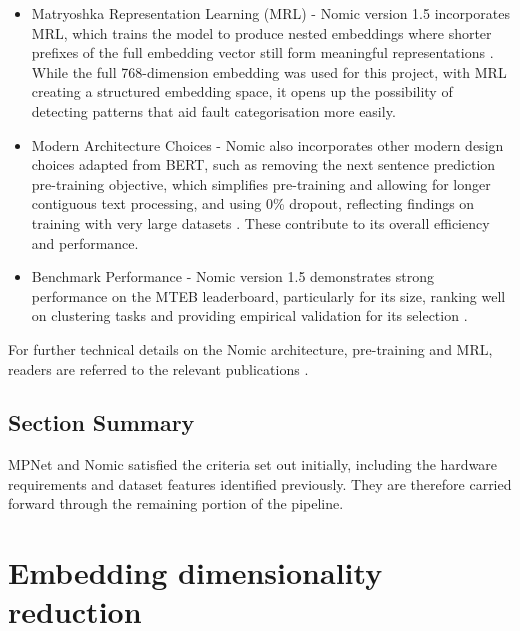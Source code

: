 \documentclass[10pt,oneside]{report}
\begin{document}
\begin{itemize}
    \item Matryoshka Representation Learning (MRL) - Nomic version 1.5 incorporates MRL, which trains the model to produce nested embeddings where shorter prefixes of the full embedding vector still form meaningful representations \cite{kusupati2022matryoshka, nussbaum2024nomic1.5}. While the full 768-dimension embedding was used for this project, with MRL creating a structured embedding space, it opens up the possibility of detecting patterns that aid fault categorisation  more easily.
    \item Modern Architecture Choices - Nomic also incorporates other modern design choices adapted from BERT, such as removing the next sentence prediction pre-training objective, which simplifies pre-training and allowing for longer contiguous text processing, and using 0\% dropout, reflecting findings on training with very large datasets \cite{nussbaum2024nomic, liu2019roberta, xue2023repeat}. These contribute to its overall efficiency and performance.
    \item Benchmark Performance - Nomic version 1.5 demonstrates strong performance on the MTEB leaderboard, particularly for its size, ranking well on clustering tasks and providing empirical validation for its selection \cite{muennighoff2022mteb, nussbaum2024nomicelo}.
\end{itemize}

For further technical details on the Nomic architecture, pre-training and MRL, readers are referred to the relevant publications \cite{nussbaum2024nomic, nussbaum2024nomic1.5, kusupati2022matryoshka}.


\subsection {Section Summary}
MPNet and Nomic satisfied the criteria set out initially, including the hardware requirements and dataset features identified previously. They are therefore carried forward through the remaining portion of the pipeline. 

\section{Embedding dimensionality reduction}

\end{document}
